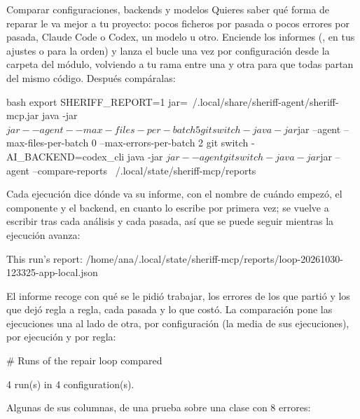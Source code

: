 \documentclass[11pt,a4paper]{article}
\begin{document}
\begin{play}{Comparar configuraciones, backends y modelos}
\when Quieres saber qué forma de reparar le va mejor a tu proyecto: pocos
ficheros por pasada o pocos errores por pasada, Claude Code o Codex, un modelo
u otro.
\asks Enciende los informes (, en tus ajustes o para la
orden) y lanza el bucle una vez por configuración desde la carpeta del módulo,
volviendo a tu rama entre una y otra para que todas partan del mismo código.
Después compáralas:
\begin{command}[basicstyle=\ttfamily\footnotesize]{bash}
export SHERIFF_REPORT=1
jar=~/.local/share/sheriff-agent/sheriff-mcp.jar
java -jar $jar --agent --max-files-per-batch 5
git switch -
java -jar $jar --agent --max-files-per-batch 0 --max-errors-per-batch 2
git switch -
AI_BACKEND=codex_cli java -jar $jar --agent
git switch -
java -jar $jar --agent --compare-reports ~/.local/state/sheriff-mcp/reports
\end{command}
\happens Cada ejecución dice dónde va su informe, con el nombre de cuándo
empezó, el componente y el backend, en cuanto lo escribe por primera vez; se
vuelve a escribir tras cada análisis y cada pasada, así que se puede seguir
mientras la ejecución avanza:
\begin{answer}
This run's report: /home/ana/.local/state/sheriff-mcp/reports/loop-20261030-123325-app-local.json
\end{answer}
El informe recoge con qué se le pidió trabajar, los errores de los que partió
y los que dejó regla a regla, cada pasada y lo que costó. La comparación pone
las ejecuciones una al lado de otra, por configuración (la media de sus
ejecuciones), por ejecución y por regla:
\begin{answer}
# Runs of the repair loop compared

4 run(s) in 4 configuration(s).
\end{answer}
Algunas de sus columnas, de una prueba sobre una clase con 8 errores:


\end{play}
\end{document}
